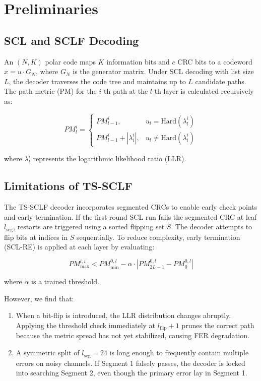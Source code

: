 \documentclass[journal,twocolumn]{IEEEtran}
\begin{document}
\section{Preliminaries}
\subsection{SCL and SCLF Decoding}
An $(N, K)$ polar code maps $K$ information bits and $c$ CRC bits to a codeword $x = u \cdot G_N$, where $G_N$ is the generator matrix. Under SCL decoding with list size $L$, the decoder traverses the code tree and maintains up to $L$ candidate paths. The path metric (PM) for the $i$-th path at the $l$-th layer is calculated recursively as:

\begin{equation}
PM_l^i = \begin{cases} PM_{l-1}^i, & u_l = \text{Hard}(\lambda_l^i) \\ PM_{l-1}^i + |\lambda_l^i|, & u_l \neq \text{Hard}(\lambda_l^i) \end{cases}
\end{equation}

where $\lambda_l^i$ represents the logarithmic likelihood ratio (LLR). 

\subsection{Limitations of TS-SCLF}
The TS-SCLF decoder incorporates segmented CRCs to enable early check points and early termination. If the first-round SCL run fails the segmented CRC at leaf $l_{\text{seg}}$, restarts are triggered using a sorted flipping set $S$. The decoder attempts to flip bits at indices in $S$ sequentially. To reduce complexity, early termination (SCL-RE) is applied at each layer by evaluating:

\begin{equation}
PM_{\text{max}}^{l, i} < PM_{\text{min}}^{0, l} - \alpha \cdot |PM_{2L-1}^{0, l} - PM_{0}^{0, l}|
\end{equation}

where $\alpha$ is a trained threshold. 

However, we find that:
\begin{enumerate}
    \item When a bit-flip is introduced, the LLR distribution changes abruptly. Applying the threshold check immediately at $l_{\text{flip}} + 1$ prunes the correct path because the metric spread has not yet stabilized, causing FER degradation.
    \item A symmetric split of $l_{\text{seg}}=24$ is long enough to frequently contain multiple errors on noisy channels. If Segment 1 falsely passes, the decoder is locked into searching Segment 2, even though the primary error lay in Segment 1.
\end{enumerate}
\end{document}
